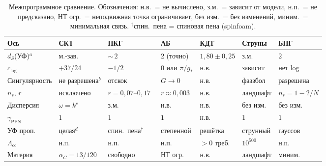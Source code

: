 \documentclass[12pt,a4paper]{article}
\theoremstyle{plain}
\theoremstyle{definition}
\theoremstyle{remark}
\begin{document}
{{{{{{\begin{table}[ht]
\centering
\caption{Межпрограммное сравнение. Обозначения: н.в.\ = не вычислено, з.м.\ = зависит от модели,
н.п.\ = не предсказано, НТ огр.\ = неподвижная точка
ограничивает, без изм.\ = без изменений, миним.\ = минимальная
связь. ${}^{\dagger}$спин.\ пена = спиновая пена (spinfoam).}
\label{tab:comparison}
\footnotesize
\setlength{\tabcolsep}{3pt}
\begin{tabular}{p{2.2cm}p{2.0cm}p{1.8cm}p{2.0cm}p{1.5cm}p{1.8cm}p{1.8cm}}
\toprule
Ось & СКТ & ПКГ & АБ & КДТ & Струны & БПГ \\
\midrule
$d_S$(УФ)${}^a$ &
  м.-зав. &
  ${\sim}\,2$ &
  $2$ (точно) &
  $1{,}80\pm0{,}25$ &
  з.м. &
  $2$ \\[4pt]
$c_{\log}$ &
  $+37/24$ &
  $-1/2$ &
  $0$ или $\pi/g_*$ &
  н.в. &
  зависит &
  нет log \\[4pt]
Сингулярность &
  не разрешена${}^b$ &
  отскок &
  $G \to 0$ &
  н.в. &
  фаззбол &
  разрешена \\[4pt]
$n_s$, $r$ &
  исключено &
  $r = 0{,}07$--$0{,}17$~\cite{AguloMorris:2015} &
  $r \approx 0{,}003$ &
  н.в. &
  ландшафт &
  $n_s = 1-2/N$ \\[4pt]
Дисперсия &
  $\omega = k$${}^c$ &
  з.м. &
  н.в. &
  н.в. &
  без изм. &
  без изм. \\[4pt]
$\gamma_{\text{PPN}}$ &
  $1$ &
  $1$ &
  $1$ &
  н.в. &
  $1$ &
  $1$ \\[4pt]
УФ проп. &
  целая${}^d$ &
  спин.\ пена${}^{\dagger}$ &
  степенной &
  решётка &
  струнный &
  гауссов \\[4pt]
$\Lambda_{\text{cc}}$ &
  н.п. &
  н.п. &
  н.п. &
  $>0$ треб. &
  $10^{500}$ &
  н.п. \\[4pt]
Материя &
  $\alpha_C = 13/120$ &
  свободно &
  НТ огр. &
  н.в. &
  ландшафт &
  миним. \\
\bottomrule
\end{tabular}

\smallskip{}
\end{table}}}}}}}
\end{document}
